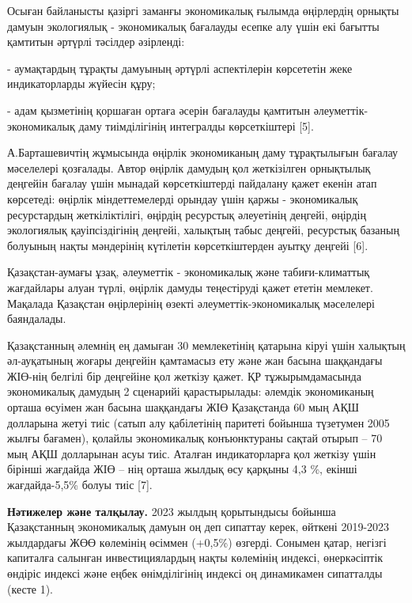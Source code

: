 \begin{multicols}{2}
Осыған байланысты қазіргі заманғы экономикалық ғылымда өңірлердің
орнықты дамуын экологиялық - экономикалық бағалауды есепке алу үшін екі
бағытты қамтитын әртүрлі тәсілдер әзірленді:

- аумақтардың тұрақты дамуының әртүрлі аспектілерін көрсететін жеке
индикаторларды жүйесін құру;

- адам қызметінің қоршаған ортаға әсерін бағалауды қамтитын
әлеуметтік-экономикалық даму тиімділігінің интегралды көрсеткіштері
{[}5{]}.

А.Барташевичтің жұмысында өңірлік экономиканың даму тұрақтылығын бағалау
мәселелері қозғалады. Автор өңірлік дамудың қол жеткізілген орнықтылық
деңгейін бағалау үшін мынадай көрсеткіштерді пайдалану қажет екенін атап
көрсетеді: өңірлік міндеттемелерді орындау үшін қаржы - экономикалық
ресурстардың жеткіліктілігі, өңірдің ресурстық әлеуетінің деңгейі,
өңірдің экологиялық қауіпсіздігінің деңгейі, халықтың табыс деңгейі,
ресурстық базаның болуының нақты мәндерінің күтілетін көрсеткіштерден
ауытқу деңгейі {[}6{]}.

Қазақстан-аумағы ұзақ, әлеуметтік - экономикалық және табиғи-климаттық
жағдайлары алуан түрлі, өңірлік дамуды теңестіруді қажет ететін
мемлекет. Мақалада Қазақстан өңірлерінің өзекті әлеуметтік-экономикалық
мәселелері баяндалады.

Қазақстанның әлемнің ең дамыған 30 мемлекетінің қатарына кіруі үшін
халықтың әл-ауқатының жоғары деңгейін қамтамасыз ету және жан басына
шаққандағы ЖІӨ-нің белгілі бір деңгейіне қол жеткізу қажет. ҚР
тұжырымдамасында экономикалық дамудың 2 сценарийі қарастырылады: әлемдік
экономиканың орташа өсуімен жан басына шаққандағы ЖІӨ Қазақстанда 60 мың
АҚШ долларына жетуі тиіс (сатып алу қабілетінің паритеті бойынша
түзетумен 2005 жылғы бағамен), қолайлы экономикалық конъюнктураны сақтай
отырып -- 70 мың АҚШ долларынан асуы тиіс. Аталған индикаторларға қол
жеткізу үшін бірінші жағдайда ЖІӨ -- нің орташа жылдық өсу қарқыны 4,3
\%, екінші жағдайда-5,5\% болуы тиіс {[}7{]}.

{\bfseries Нәтижелер және талқылау.} 2023 жылдың қорытындысы бойынша
Қазақстанның экономикалық дамуын оң деп сипаттау керек, өйткені
2019-2023 жылдардағы ЖӨӨ көлемінің өсіммен (+0,5\%) өзгерді. Сонымен
қатар, негізгі капиталға салынған инвестициялардың нақты көлемінің
индексі, өнеркәсіптік өндіріс индексі және еңбек өнімділігінің индексі
оң динамикамен сипатталды (кесте 1).
\end{multicols}


